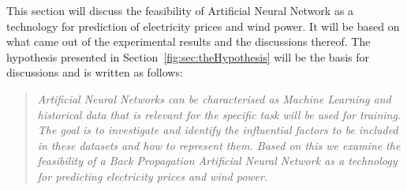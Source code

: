 This section will discuss the feasibility of Artificial Neural Network as a technology for prediction of electricity prices and wind power. It will be based on what came out of the experimental results and the discussions thereof. The hypothesis presented in Section~\ref{fig:sec:theHypothesis} will be the basis for discussions and is written as follows:

\begin{quotation}
\textit{Artificial Neural Networks can be characterised as Machine Learning\cite{18} and historical data that is relevant for the specific task will be used for training. The goal is to investigate and identify the influential factors to be included in these datasets and how to represent them. Based on this we examine the feasibility of a Back Propagation Artificial Neural Network as a technology for predicting electricity prices and wind power.}
\end{quotation}

